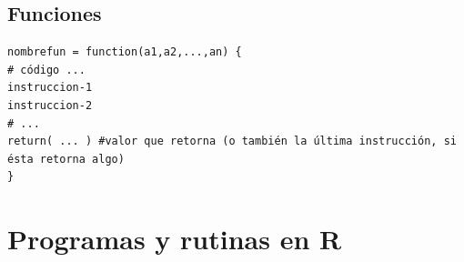 \documentclass[12pt]{article}
\begin{document}
\subsection{Funciones}

\begin{verbatim}
nombrefun = function(a1,a2,...,an) {
# código ...
instruccion-1
instruccion-2
# ...
return( ... ) #valor que retorna (o también la última instrucción, si ésta retorna algo)
}
\end{verbatim}




\section{Programas y rutinas en R}
\end{document}
